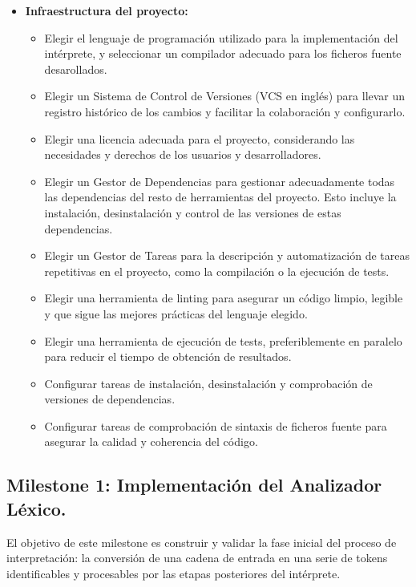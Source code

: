 \begin{itemize}
    \item \textbf{Infraestructura del proyecto:}
    \begin{itemize}
        \item Elegir el lenguaje de programación utilizado para la implementación del intérprete, y seleccionar un compilador adecuado para los ficheros fuente desarollados.
        \item Elegir un Sistema de Control de Versiones (VCS en inglés) para llevar un registro histórico de los cambios y facilitar la colaboración y configurarlo.
        \item Elegir una licencia adecuada para el proyecto, considerando las necesidades y derechos de los usuarios y desarrolladores.
        \item Elegir un Gestor de Dependencias para gestionar adecuadamente todas las dependencias del resto de herramientas del proyecto. Esto incluye la instalación, desinstalación y control de las versiones de estas dependencias.
        \item Elegir un Gestor de Tareas para la descripción y automatización de tareas repetitivas en el proyecto, como la compilación o la ejecución de tests.
        \item Elegir una herramienta de linting para asegurar un código limpio, legible y que sigue las mejores prácticas del lenguaje elegido.
        \item Elegir una herramienta de ejecución de tests, preferiblemente en paralelo para reducir el tiempo de obtención de resultados.
        \item Configurar tareas de instalación, desinstalación y comprobación de versiones de dependencias.
        \item Configurar tareas de comprobación de sintaxis de ficheros fuente para asegurar la calidad y coherencia del código.
    \end{itemize}
\end{itemize}

\subsection{Milestone 1: Implementación del Analizador Léxico.}
El objetivo de este milestone es construir y validar la fase inicial del proceso de interpretación: la conversión de una cadena de entrada en una serie de tokens identificables y procesables por las etapas posteriores del intérprete.

